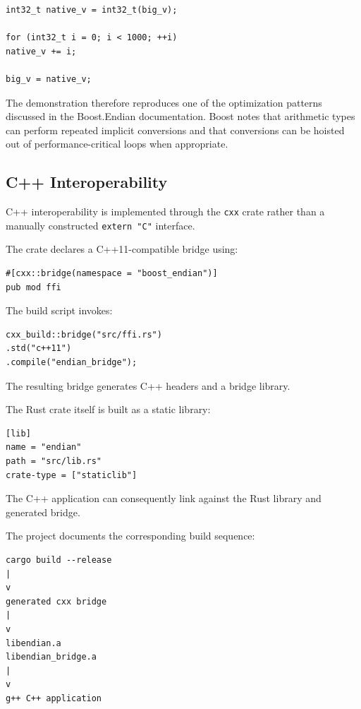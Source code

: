 \begin{lstlisting}[style=cppblock]
int32_t native_v = int32_t(big_v);

for (int32_t i = 0; i < 1000; ++i)
native_v += i;

big_v = native_v;
\end{lstlisting}

The demonstration therefore reproduces one of the optimization patterns discussed in the Boost.Endian documentation. 
Boost notes that arithmetic types can perform repeated implicit conversions and that conversions can be hoisted out of 
performance-critical loops when appropriate.


\subsection{C++ Interoperability}

C++ interoperability is implemented through the \texttt{cxx} crate rather than a manually constructed \texttt{extern "C"} interface.

The crate declares a C++11-compatible bridge using:

\begin{lstlisting}[style=rustblock]
#[cxx::bridge(namespace = "boost_endian")]
pub mod ffi
\end{lstlisting}

The build script invokes:

\begin{lstlisting}[style=rustblock]
cxx_build::bridge("src/ffi.rs")
.std("c++11")
.compile("endian_bridge");
\end{lstlisting}

The resulting bridge generates C++ headers and a bridge library.

The Rust crate itself is built as a static library:

\begin{lstlisting}
[lib]
name = "endian"
path = "src/lib.rs"
crate-type = ["staticlib"]
\end{lstlisting}

The C++ application can consequently link against the Rust library and generated bridge.

The project documents the corresponding build sequence:

\begin{lstlisting}
cargo build --release
|
v
generated cxx bridge
|
v
libendian.a
libendian_bridge.a
|
v
g++ C++ application
\end{lstlisting}

